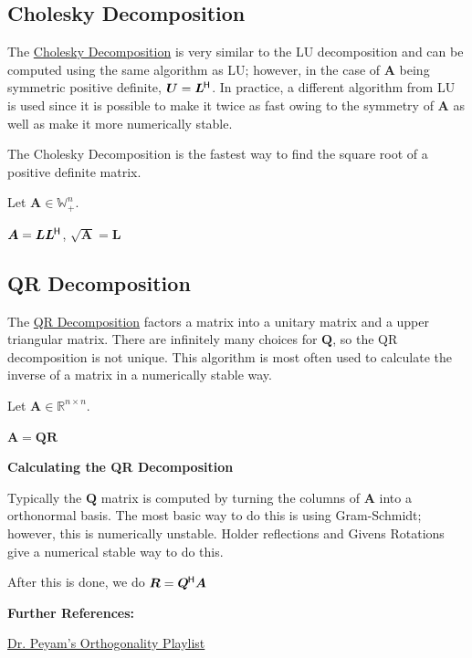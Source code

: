 \documentclass[11pt]{article}
\begin{document}
  \subsection{Cholesky Decomposition}

  The \href{https://www.wikiwand.com/en/Cholesky_decomposition}{Cholesky Decomposition} is
  very similar to the LU decomposition and can be computed using
  the same algorithm as LU; however, in the case of \(\bm{A}\) being symmetric positive definite,
  \(\bm{U} = \bm{L}^{\mkern-1.5mu\mathsf{H}}\). In practice, a different algorithm from LU is used since it is possible to make
  it twice as fast owing to the symmetry of \(\bm{A}\) as well as make it more numerically stable.

  The Cholesky Decomposition is the fastest way to find the square root of a
  positive definite matrix.

  Let \(\bm{A} \in \mathbb{W}_+^{n}\).

  \(\bm{A} = \bm{L}\bm{L}^{\mkern-1.5mu\mathsf{H}}\), \(\sqrt{\bm{A}} = \bm{L}\)

  \pagebreak

  \subsection{QR Decomposition}

  The \href{https://www.wikiwand.com/en/QR_decomposition}{QR Decomposition} factors a matrix into a unitary matrix and a upper triangular matrix. There are
  infinitely many choices for \(\bm{Q}\), so the QR decomposition is not unique.
  This algorithm is most often used to calculate the inverse of a matrix in a numerically stable way.

  Let \(\bm{A} \in \mathbb{R}^{n \times n}\).

  \(\bm{A} = \bm{Q}\bm{R}\)

  \textbf{Calculating the QR Decomposition}

  Typically the \(\bm{Q}\) matrix is computed by turning the columns of \(\bm{A}\) into a orthonormal basis.
  The most basic way to do this is using Gram-Schmidt; however, this is numerically unstable. Holder
  reflections and Givens Rotations give a numerical stable way to do this.

  After this is done, we do \(\bm{R} = \bm{Q}^{\mkern-1.5mu\mathsf{H}}\bm{A}\)

  \textbf{Further References:}

  \href{https://www.youtube.com/watch?v=Z8ceNvUgI4Q&list=PLJb1qAQIrmmAreTtzhE6MuJhAhwYYo_a9&index=1&t=0s}
  {Dr. Peyam's Orthogonality Playlist}
\end{document}
